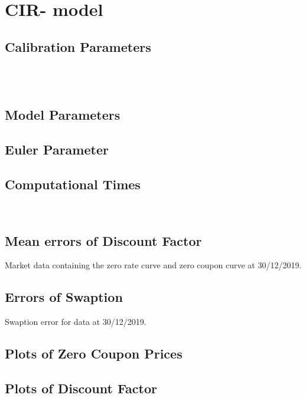 \section{CIR- model}
\subsection{Calibration Parameters}
	
	\cirParamTableA\hfill\\
	\cirErrorTableA\hfill\\
\subsection{Model Parameters}
	
	\modelParamTableA
\subsection{Euler Parameter}
	
	\eulerParamA
\subsection{Computational Times}
	
	\ctimeA
\hfill\\
	
	\ctimeTestsA
\subsection{Mean errors of Discount Factor}
	
\begin{table}
	\dfMeanErrA
\centering
\caption{Market data containing the zero rate curve and zero coupon curve at 30/12/2019.}
\label{tab:market_dataA}
\end{table}
\subsection{Errors of Swaption}
	
\begin{table}
	\errorSwaptionA
\centering
\caption{Swaption error for data at 30/12/2019.}
\label{tab:swaption_errorA}
\end{table}
\subsection{Plots of Zero Coupon Prices}
	
\subsection{Plots of Discount Factor}
	
